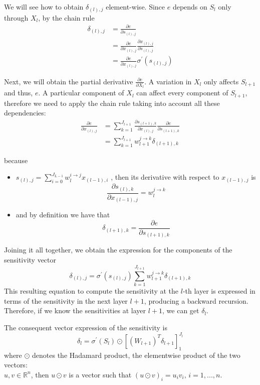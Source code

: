 We will see how to obtain $\delta_{(l),j}$ element-wise. Since $e$ depends on $S_l$ only through $X_l$, by the chain rule
\begin{align}
    \delta_{(l),j} &= \frac{\partial e}{\partial s_{(l),j}} \\
    &= \frac{\partial e}{\partial x_{(l),j}}\frac{\partial x_{(l),j}}{\partial s_{(l),j}} \\
    &= \frac{\partial e}{\partial x_{(l),j}} \sigma^\prime (s_{(l),j})
\end{align}

Next, we will obtain the partial derivative $\frac{\partial e}{\partial X_l}$. A variation in $X_l$ only affects $S_{l+1}$ and thus, $e$. A particular component of $X_l$ can affect every component of $S_{l+1}$, therefore we need to apply the chain rule taking into account all these dependencies:
\begin{align}
    \frac{\partial e}{\partial x_{(l),j}} &= \sum_{k=1}^{J_{l+1}} \frac{\partial s_{(l+1),k}}{\partial x_{(l),j}} \frac{\partial e}{\partial s_{(l+1),k}} \\
    &= \sum_{k=1}^{J_{l+1}} w_{l+1}^{j \rightarrow k} \delta_{(l+1), k}
\end{align}

because
\begin{itemize}
    \item $s_{(l),j} = \sum_{i=0}^{J_{L-1}}w_l^{i\rightarrow j}x_{(l-1),i}$ , 
    then its derivative with respect to $x_{(l-1),j}$ is 
    $$\frac{\partial s_{(l),k}}{\partial x_{(l-1),j}} = w_{l}^{j \rightarrow k}$$

    \item and by definition we have that
    $$\delta_{(l+1),k} = \frac{\partial e}{\partial s_{(l+1),k}} $$
\end{itemize}

Joining it all together, we obtain the expression for the components of the sensitivity vector
\begin{equation}
    \delta_{(l),j} = \sigma^{\prime}(s_{(l),j}) \sum_{k=1}^{J_{l+1}} w_{l+1}^{j\rightarrow k} \delta_{(l+1),k}
\end{equation}
This resulting equation to compute the sensitivity at the $l$-th layer is expressed in terms of the sensitivity in the next layer $l+1$, producing a backward recursion. Therefore, if we know the sensitivities at layer $l+1$, we can get $\delta_l$. 

The consequent vector expression of the sensitivity is
\begin{equation}
    \delta_l = \sigma^{\prime}(S_l) \odot [(W_{l+1})^T\delta_{l+1}]_{1}^{J_l}
\end{equation}
where $\odot$ denotes the Hadamard product, the elementwise product of the two vectors: \\ $u,v \in \mathbb{R}^n$, then $u \odot v $ is a vector such that $ (u \odot v)_i =u_i v_i, \, i = 1,...,n$. 

